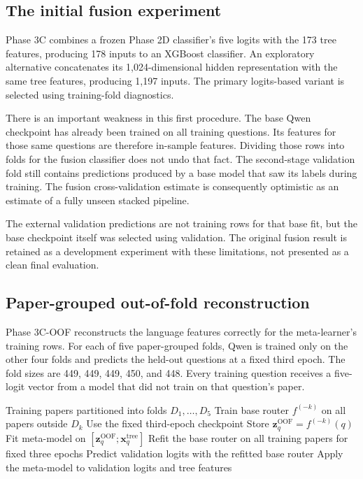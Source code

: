 \subsection{The initial fusion experiment}
Phase 3C combines a frozen Phase 2D classifier's five logits with the
173 tree features, producing 178 inputs to an XGBoost classifier.
An exploratory alternative concatenates its 1,024-dimensional hidden
representation with the same tree features, producing 1,197 inputs.
The primary logits-based variant is selected using training-fold
diagnostics.

There is an important weakness in this first procedure. The base Qwen
checkpoint has already been trained on all training questions. Its
features for those same questions are therefore in-sample features.
Dividing those rows into folds for the fusion classifier does not
undo that fact. The second-stage validation fold still contains
predictions produced by a base model that saw its labels during
training. The fusion cross-validation estimate is consequently
optimistic as an estimate of a fully unseen stacked pipeline.

The external validation predictions are not training rows for that
base fit, but the base checkpoint itself was selected using validation.
The original fusion result is retained as a development experiment
with these limitations, not presented as a clean final evaluation.

\subsection{Paper-grouped out-of-fold reconstruction}
Phase 3C-OOF reconstructs the language features correctly for the
meta-learner's training rows. For each of five paper-grouped folds,
Qwen is trained only on the other four folds and predicts the held-out
questions at a fixed third epoch. The fold sizes are 449, 449, 449,
450, and 448. Every training question receives a five-logit vector
from a model that did not train on that question's paper.

\begin{algorithm}[tbp]
\caption{Construction of out-of-fold language features}
\label{alg:oof}
\begin{algorithmic}[1]
\Require Training papers partitioned into folds $D_1,\ldots,D_5$
  \State Train base router $f^{(-k)}$ on all papers outside $D_k$
  \State Use the fixed third-epoch checkpoint
    \State Store $\mathbf{z}^{\mathrm{OOF}}_q=f^{(-k)}(q)$
  \EndFor
\EndFor
\State Fit meta-model on $[\mathbf{z}^{\mathrm{OOF}}_q;\mathbf{x}^{\mathrm{tree}}_q]$
\State Refit the base router on all training papers for fixed three epochs
\State Predict validation logits with the refitted base router
\State Apply the meta-model to validation logits and tree features
\end{algorithmic}
\end{algorithm}

